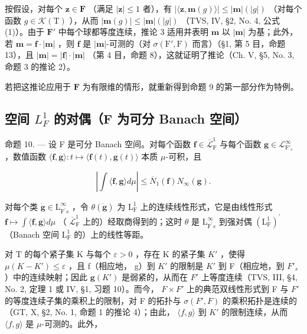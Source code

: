 按假设，对每个 \(\mathbf{z} \in \mathbf{F}\) （满足 \(|\mathbf{z}| \leqslant 1\) 者），有 \(|\langle \mathbf{z}, \mathbf{m}(g) \rangle| \leqslant |\mathbf{m}|(|g|)\) （对每个函数 \(g \in \mathcal{K}(\mathrm{T})\) ），从而 \(|\mathbf{m}(g)| \leqslant |\mathbf{m}|(|g|)\) （TVS, IV, §2, No. 4, 公式 (1)）。由于 \(\mathbf{F}'\) 中每个球都等度连续，推论 3 适用并表明 \(\mathbf{m}\) 以 \(|\mathbf{m}|\) 为基；此外，若 \(\mathbf{m} = \mathbf{f} \cdot |\mathbf{m}|\) ，则 \(\mathbf{f}\) 是 \(|\mathbf{m}|\)-可测的（对 \(\sigma(\mathrm{F}', \mathrm{F})\) 而言）（§1, 第 5 目，命题 13），且 \(|\mathbf{m}| = |\mathbf{f}| \cdot |\mathbf{m}|\) （第 4 目，命题 8），这就证明了推论（Ch. V, §5, No. 3, 命题 3 的推论 2）。

若把这推论应用于 \(\mathbf{F}\) 为有限维的情形，就重新得到命题 9 的第一部分作为特例。

\subsection{\texorpdfstring{空间 \(L_{F}^{1}\) 的对偶（F 为可分 Banach 空间）}{空间 L sub F superscript 1 的对偶（F 为可分 Banach 空间）}}

命题 10. --- 设 F 是可分 Banach 空间。对每个函数 \(\mathbf{f} \in \overline{\mathcal{L}}_{\mathrm{F}}^{1}\) 与每个函数 \(\mathbf{g} \in \mathcal{L}_{\mathrm{F}'_s}^{\infty}\) ，数值函数 \(\langle \mathbf{f}, \mathbf{g} \rangle : t \mapsto \langle \mathbf{f}(t), \mathbf{g}(t) \rangle\) 本质 \(\mu\)-可积，且

\[
\left| \int \langle \mathbf {f}, \mathbf {g} \rangle d \mu \right| \leqslant \overline {{{{N}}}} _ {1} (\mathbf {f}) N _ {\infty} (\mathbf {g}).\tag{3}
\]

对每个类 \(\dot{\mathbf{g}}\in\mathrm{L}_{\mathrm{F}^{\prime}s}^{\infty}\) ，令 \(\theta(\dot{\mathbf{g}})\) 为 \(\mathrm{L}_{\mathrm{F}}^{1}\) 上的连续线性形式，它是由线性形式 \(\mathbf{f}\mapsto\int\langle\mathbf{f},\mathbf{g}\rangle d\mu\) （ \(\overline{\mathcal{L}}_{\mathrm{F}}^{1}\) 上的）经取商得到的；这时 \(\theta\) 是 \(\mathrm{L}_{\mathrm{F}^{\prime}s}^{\infty}\) 到强对偶 \((\mathrm{L}_{\mathrm{F}}^{1})^{\prime}\) （Banach 空间 \(\mathrm{L}_{\mathrm{F}}^{1}\) 的）上的线性等距。

对 T 的每个紧子集 K 与每个 \(\varepsilon > 0\) ，存在 K 的紧子集 \(K'\) ，使得 \(\mu(K - K') \leqslant \varepsilon\) ，且 f（相应地， g）到 \(K'\) 的限制是 \(K'\) 到 F（相应地，到 \(F'_s\) ）中的连续映射；因此 \(\mathbf{g}(K')\) 是弱紧的，从而在 \(F'\) 上等度连续（TVS, III, §4, No. 2, 定理 1 或 IV, §1, 习题 10）。而今， \(F \times F'\) 上的典范双线性形式到 F 与 \(F'\) 的等度连续子集的乘积上的限制，对 F 的拓扑与 \(\sigma(F', F)\) 的乘积拓扑是连续的（GT, X, §2, No. 1, 命题 1 的推论 4）；由此， \(\langle f, g \rangle\) 到 \(K'\) 的限制连续，从而 \(\langle f, g \rangle\) 是 \(\mu\)-可测的。此外，

